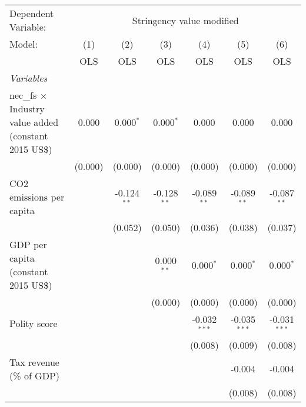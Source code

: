 
\begingroup
\centering
\begin{tabular}{lcccccc}
   \toprule
   Dependent Variable: & \multicolumn{6}{c}{Stringency value modified}\\
   Model:                                                        & (1)     & (2)           & (3)           & (4)            & (5)            & (6)\\  
                                                                 &  OLS    & OLS           & OLS           & OLS            & OLS            & OLS\\  
   \midrule
   \emph{Variables}\\
   nec\_fs $\times$ Industry value added (constant 2015 US\$)    & 0.000   & 0.000$^{*}$   & 0.000$^{*}$   & 0.000          & 0.000          & 0.000\\   
                                                                 & (0.000) & (0.000)       & (0.000)       & (0.000)        & (0.000)        & (0.000)\\   
   CO2 emissions per capita                                      &         & -0.124$^{**}$ & -0.128$^{**}$ & -0.089$^{**}$  & -0.089$^{**}$  & -0.087$^{**}$\\   
                                                                 &         & (0.052)       & (0.050)       & (0.036)        & (0.038)        & (0.037)\\   
   GDP per capita (constant 2015 US\$)                           &         &               & 0.000$^{**}$  & 0.000$^{*}$    & 0.000$^{*}$    & 0.000$^{*}$\\   
                                                                 &         &               & (0.000)       & (0.000)        & (0.000)        & (0.000)\\   
   Polity score                                                  &         &               &               & -0.032$^{***}$ & -0.035$^{***}$ & -0.031$^{***}$\\   
                                                                 &         &               &               & (0.008)        & (0.009)        & (0.008)\\   
   Tax revenue (\% of GDP)                                       &         &               &               &                & -0.004         & -0.004\\   
                                                                 &         &               &               &                & (0.008)        & (0.008)\\   

\end{tabular}
